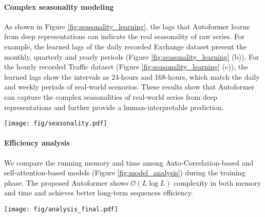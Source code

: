\paragraph{Complex seasonality modeling} As shown in Figure \ref{fig:seasonality_learning}, the lags that Autoformer learns from deep representations can indicate the real seasonality of raw series. For example, the learned lags of the daily recorded Exchange dataset present the monthly, quarterly and yearly periods (Figure \ref{fig:seasonality_learning} (b)). For the hourly recorded Traffic dataset (Figure \ref{fig:seasonality_learning} (c)), the learned lags show the intervals as 24-hours and 168-hours, which match the daily and weekly periods of real-world scenarios. These results show that Autoformer can capture the complex seasonalities of real-world series from deep representations and further provide a human-interpretable prediction.

\begin{figure*}[tbp]
  \begin{center}
    \centerline{\texttt{[image: fig/seasonality.pdf]}}
    \vspace{-5pt}
    \caption{Statistics of learned lags. For each time series in the test set, we count the top 10 lags learned by decoder for the input-96-predict-336 task. Figure (a)-(d) are the density histograms.}
    \label{fig:seasonality_learning}
    \vspace{-20pt}
  \end{center}
  \end{figure*}

\paragraph{Efficiency analysis} We compare the running memory and time among Auto-Correlation-based and self-attention-based models (Figure \ref{fig:model_analysis}) during the training phase. The proposed Autoformer shows $\mathcal{O}(L\log L)$ complexity in both memory and time and achieves better long-term sequences efficiency.

\begin{figure*}[thbp]
\begin{center}
	\centerline{\texttt{[image: fig/analysis\_final.pdf]}}
	\vspace{-5pt}
	\caption{Efficiency Analysis. For memory, we replace Auto-Correlation with self-attention family in Autoformer and record the memory with input 96. For running time, we run the Auto-Correlation or self-attentions $10^3$ times to get the execution time per step. The output length increases exponentially.}
	\label{fig:model_analysis}
	\vspace{-20pt}
\end{center}
\end{figure*}

